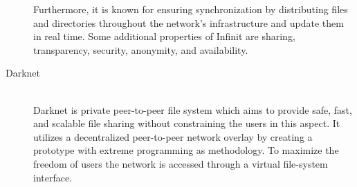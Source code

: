 \begin{description}
	Furthermore, it is known for ensuring synchronization by distributing files and directories throughout the network's infrastructure and update them in real time. Some additional properties of Infinit are sharing, transparency, security, anonymity, and availability.
	\item[Darknet]\-\\
	Darknet \cite{Ledung:2010wq} is private peer-to-peer file system which aims to provide safe, fast, and scalable file sharing without constraining the users in this aspect. It utilizes a decentralized peer-to-peer network overlay by creating a prototype with extreme programming as methodology. To maximize the freedom of users the network is accessed through a virtual file-system interface.
\end{description}
